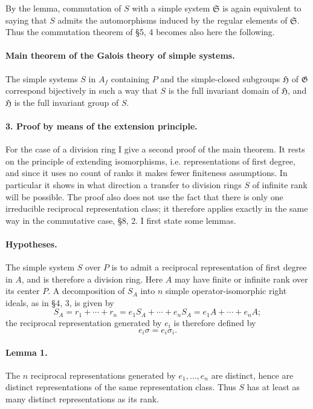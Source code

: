 \documentclass[11pt]{article}
\providecommand{\Gcal}{\mathfrak G}
\begin{document}
By the lemma, commutation of \(S\) with a simple system \(\mathfrak S\) is again equivalent to saying that \(S\) admits the automorphisms induced by the regular elements of \(\mathfrak S\). Thus the commutation theorem of §5, 4 becomes also here the following.

\paragraph{Main theorem of the Galois theory of simple systems.}
The simple systems \(S\) in \(A_f\) containing \(P\) and the simple-closed subgroups \(\mathfrak H\) of \(\Gcal\) correspond bijectively in such a way that \(S\) is the full invariant domain of \(\mathfrak H\), and \(\mathfrak H\) is the full invariant group of \(S\).

\paragraph{3. Proof by means of the extension principle.}
For the case of a division ring I give a second proof of the main theorem. It rests on the principle of extending isomorphisms, i.e. representations of first degree, and since it uses no count of ranks it makes fewer finiteness assumptions. In particular it shows in what direction a transfer to division rings \(S\) of infinite rank will be possible. The proof also does not use the fact that there is only one irreducible reciprocal representation class; it therefore applies exactly in the same way in the commutative case, §8, 2. I first state some lemmas.

\paragraph{Hypotheses.}
The simple system \(S\) over \(P\) is to admit a reciprocal representation of first degree in \(A\), and is therefore a division ring. Here \(A\) may have finite or infinite rank over its center \(P\). A decomposition of \(S_A\) into \(n\) simple operator-isomorphic right ideals, as in §4, 3, is given by
\[
        S_A=r_1+\cdots+r_n
            =e_1S_A+\cdots+e_nS_A
            =e_1A+\cdots+e_nA ;
\]
the reciprocal representation generated by \(e_i\) is therefore defined by
\[
        e_i\sigma=e_i\sigma_i .
\]

\paragraph{Lemma 1.}
The \(n\) reciprocal representations generated by \(e_1,\ldots,e_n\) are distinct, hence are distinct representations of the same representation class. Thus \(S\) has at least as many distinct representations as its rank.
\end{document}

